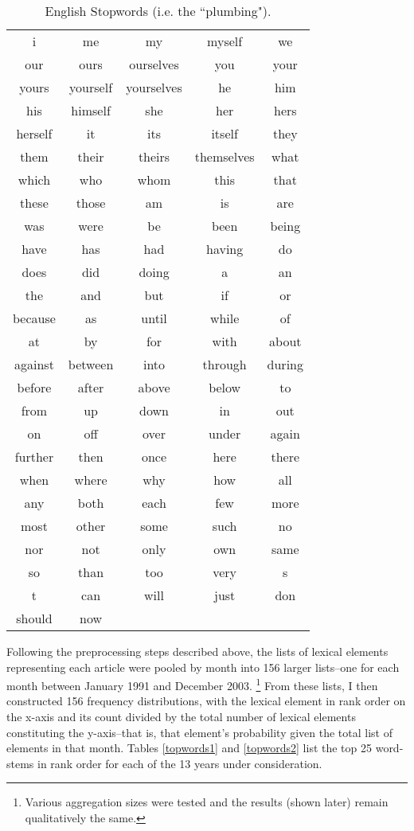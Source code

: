 \begin{table}
\begin{center}
\caption[English Stopwords]{English Stopwords (i.e. the ``plumbing"). \label{stop}}
\vspace{0.3in}
\begin{tabular}{ccccc}
\hline 
\hline
i & me & my & myself & we \\
our & ours & ourselves & you & your \\
yours & yourself & yourselves & he & him \\
his & himself & she & her & hers\\
herself & it & its & itself & they\\
them & their & theirs & themselves & what \\
which & who & whom & this & that \\
these & those & am & is & are\\
was & were & be & been & being \\
have & has & had & having & do\\
does & did & doing & a & an \\
the & and & but & if & or \\
because & as & until & while & of \\
at & by & for & with & about \\
against & between & into & through & during \\
before & after & above & below & to \\
from & up & down & in & out \\
on & off & over & under & again \\
further & then & once & here & there \\
when & where & why & how & all \\
any & both & each & few & more \\
most & other & some & such & no \\
nor & not & only & own & same \\
so & than & too & very & s \\
t & can & will & just & don \\
should & now & & & \\
\hline
\end{tabular}
\end{center}
\end{table}

Following the preprocessing steps described above, the lists of lexical elements representing each article were pooled by month into 156 larger lists--one for each month between January 1991 and December 2003. \footnote{Various aggregation sizes were tested and the results (shown later) remain qualitatively the same.} From these lists, I then constructed 156 frequency distributions, with the lexical element in rank order on the x-axis and its count divided by the total number of lexical elements constituting the y-axis--that is, that element's probability given the total list of elements in that month. Tables \ref{topwords1} and \ref{topwords2} list the top 25 word-stems in rank order for each of the 13 years under consideration. 

